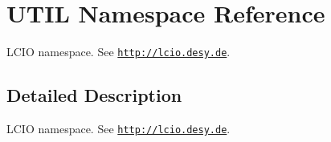 \hypertarget{namespace_u_t_i_l}{}\section{U\+T\+IL Namespace Reference}
\label{namespace_u_t_i_l}


L\+C\+IO namespace. See \href{http://lcio.desy.de}{\tt http\+://lcio.\+desy.\+de}.  




\subsection{Detailed Description}
L\+C\+IO namespace. See \href{http://lcio.desy.de}{\tt http\+://lcio.\+desy.\+de}. 